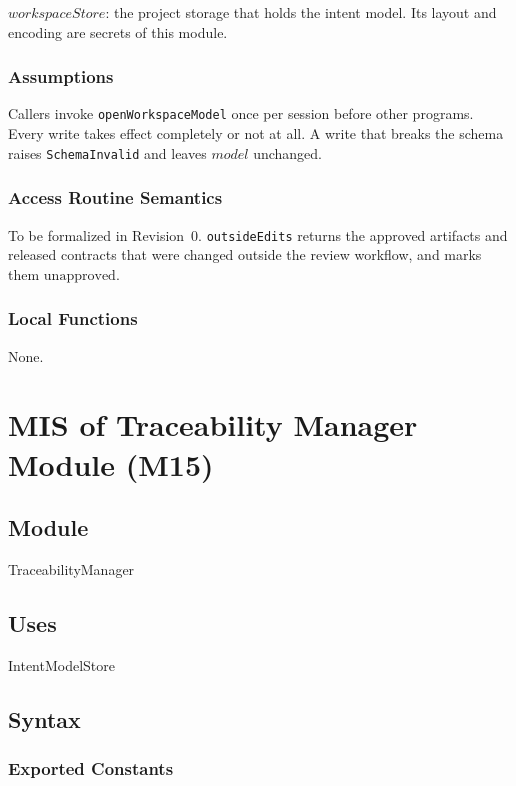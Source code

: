 \documentclass[12pt, titlepage]{article}
\begin{document}
$workspaceStore$: the project storage that holds the intent model. Its layout
and encoding are secrets of this module.

\subsubsection{Assumptions}

Callers invoke \texttt{openWorkspaceModel} once per session before other
programs. Every write takes effect completely or not at all. A write that breaks
the schema raises \texttt{SchemaInvalid} and leaves $model$ unchanged.

\subsubsection{Access Routine Semantics}

To be formalized in Revision~0. \texttt{outsideEdits} returns the approved
artifacts and released contracts that were changed outside the review workflow,
and marks them $\mathrm{unapproved}$.

\subsubsection{Local Functions}

None.

\newpage
\section{MIS of Traceability Manager Module (M15)} \label{MISTrace}

\subsection{Module}

TraceabilityManager

\subsection{Uses}

IntentModelStore

\subsection{Syntax}

\subsubsection{Exported Constants}
\end{document}
